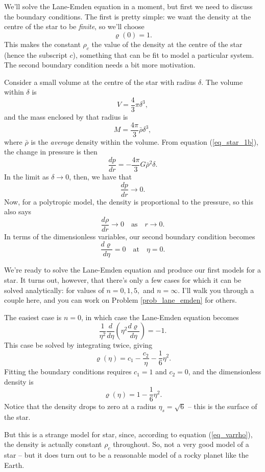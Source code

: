 We'll solve the Lane-Emden equation in a moment, but first we need to discuss the boundary conditions.  The first is pretty simple: we want the density at the centre of the star to be \emph{finite}, so we'll choose
\begin{equation}
\varrho(0) = 1.
\end{equation}
This makes the constant $\rho_c$ the value of the density at the centre of the star (hence the subscript $c$), something that can be fit to model a particular system.  The second boundary condition needs a bit more motivation.  

Consider a small volume at the centre of the star with radius $\delta$.  The volume within $\delta$ is
\[
V = \frac{4}{3} \pi \delta^3,
\]
and the mass enclosed by that radius is
\[
M = \frac{4\pi}{3} \bar{\rho} \delta^3,
\]
where $\bar{\rho}$ is the \emph{average} density within the volume.  From equation (\ref{eq_star_1b}), the change in pressure is then
\[
\frac{dp}{dr} = -\frac{4\pi}{3} G \bar{\rho}^2 \delta.
\]
In the limit as $\delta \to 0$, then, we have that
\[
\frac{dp}{dr} \to 0.
\]
Now, for a polytropic model, the density is proportional to the pressure, so this also says
\[
\frac{d\rho}{dr} \to 0 \quad \text{as} \quad r \to 0.
\]
In terms of the dimensionless variables, our second boundary condition becomes
\begin{equation}
\frac{d\varrho}{d\eta} = 0 \quad \text{at} \quad \eta = 0.
\end{equation}

We're ready to solve the Lane-Emden equation and produce our first models for a star.  It turns out, however, that there's only a few cases for which it can be solved analytically:  for values of $n = 0, 1, 5,$ and $n = \infty$.  I'll walk you through a couple here, and you can work on Problem \ref{prob_lane_emden} for others.

\begin{example}[n = 0]
The easiest case is $n = 0$, in which case the Lane-Emden equation becomes
\[
\frac{1}{\eta^2} \frac{d}{d\eta} \left( \eta^2 \frac{d\varrho}{d\eta} \right) = -1.
\]
This case be solved by integrating twice, giving
\[
\varrho(\eta) = c_1 - \frac{c_2}{\eta} - \frac{1}{6} \eta^2.
\]
Fitting the boundary conditions requires $c_1 = 1$ and $c_2 = 0$, and the dimensionless density is
\[
\varrho(\eta) = 1 - \frac{1}{6} \eta^2.
\]
Notice that the density drops to zero at a radius $\eta_s = \sqrt{6}$ -- this is the surface of the star.  

But this is a strange model for star, since, according to equation (\ref{eq_varrho}), the density is actually constant $\rho_c$ throughout.  So, not a very good model of a star -- but it does turn out to be a reasonable model of a rocky planet like the Earth.
\end{example}

